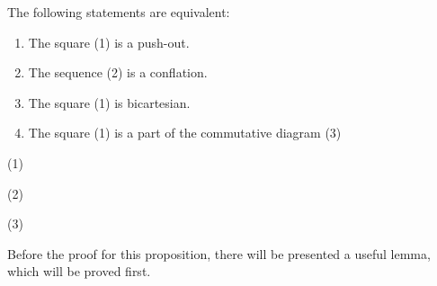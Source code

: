     \begin{prop} 
        The following statements are equivalent:
        \begin{enumerate}
            \item The square (1) is a push-out.
            \item The sequence (2) is a conflation.
            \item The square (1) is bicartesian.
            \item The square (1) is a part of the commutative diagram (3)
        \end{enumerate}
        \begin{center}
            (1)
            \space (2)
            \space (3)
        \end{center}
    \end{prop}

    Before the proof for this proposition, there will be presented a useful lemma, which will be proved first.

